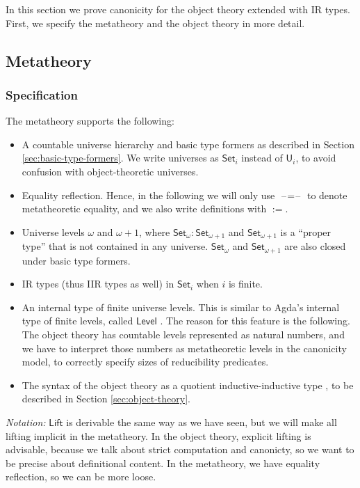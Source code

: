 \documentclass[acmsmall,screen,review,anonymous]{acmart}
\newcommand{\msf}[1]{{\mathsf{#1}}}
\newcommand{\U}{\msf{U}}
\newcommand{\Set}{\msf{Set}}
\newcommand{\Lift}{\msf{Lift}}
\newcommand{\blank}{{\mathord{\hspace{1pt}\text{--}\hspace{1pt}}}}
\newcommand{\Level}{\msf{Level}}
\begin{document}
In this section we prove canonicity for the object theory extended with IR types. First, we specify
the metatheory and the object theory in more detail.

\subsection{Metatheory}\label{sec:metatheory}

\subsubsection{Specification} The metatheory supports the following:
\begin{itemize}
  \item A countable universe hierarchy and basic type formers as described in Section \ref{sec:basic-type-formers}.
    We write universes as $\Set_i$ instead of $\U_i$, to avoid confusion with object-theoretic
    universes.
  \item Equality reflection. Hence, in the following we will only use $\blank\!=\!\blank$ to denote
    metatheoretic equality, and we also write definitions with $:=$.
  \item Universe levels $\omega$ and $\omega+1$, where $\Set_\omega : \Set_{\omega + 1}$ and $\Set_{\omega + 1}$
        is a ``proper type'' that is not contained in any universe. $\Set_\omega$ and $\Set_{\omega + 1}$ are
        also closed under basic type formers.
  \item IR types (thus IIR types as well) in $\Set_i$ when $i$ is finite.
  \item An internal type of finite universe levels. This is similar to Agda's internal type of
    finite levels, called $\Level$ \cite{agdadocs}. The reason for this feature is the following. The
    object theory has countable levels represented as natural numbers, and we have to interpret
    those numbers as metatheoretic levels in the canonicity model, to correctly specify sizes of
    reducibility predicates.
  \item The syntax of the object theory as a quotient inductive-inductive type \cite{ttintt,DBLP:journals/corr/abs-2302-08837}, to be
    described in Section \ref{sec:object-theory}.
\end{itemize}
\emph{Notation:} $\Lift$ is derivable the same way as we have seen, but we will make all
lifting implicit in the metatheory. In the object theory, explicit lifting is advisable, because
we talk about strict computation and canonicty, so we want to be precise about definitional
content. In the metatheory, we have equality reflection, so we can be more loose.
\end{document}
